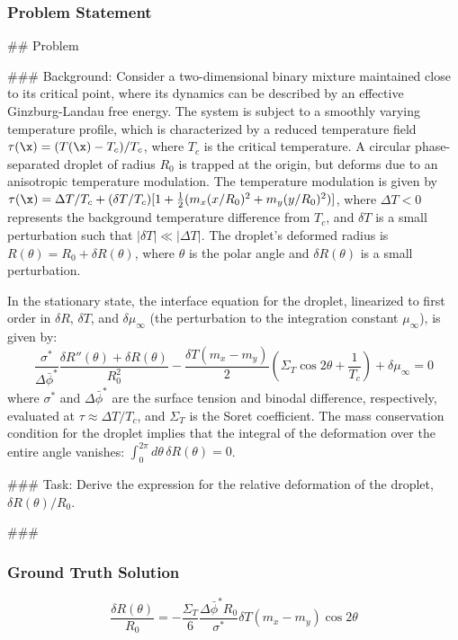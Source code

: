 \documentclass[10pt]{article}
\begin{document}
\subsubsection*{Problem Statement}
## Problem

### Background:
Consider a two-dimensional binary mixture maintained close to its critical point, where its dynamics can be described by an effective Ginzburg-Landau free energy. The system is subject to a smoothly varying temperature profile, which is characterized by a reduced temperature field $\tau(\x) = (T(\x)-T_c)/T_c$, where $T_c$ is the critical temperature. A circular phase-separated droplet of radius $R_0$ is trapped at the origin, but deforms due to an anisotropic temperature modulation. The temperature modulation is given by $\tau(\x) = \Delta T/T_c + (\delta T/T_c) [1 + \frac{1}{2}(m_x(x/R_0)^2 + m_y(y/R_0)^2)]$, where $\Delta T < 0$ represents the background temperature difference from $T_c$, and $\delta T$ is a small perturbation such that $|\delta T| \ll |\Delta T|$. The droplet's deformed radius is $R(\theta) = R_0 + \delta R(\theta)$, where $\theta$ is the polar angle and $\delta R(\theta)$ is a small perturbation.

In the stationary state, the interface equation for the droplet, linearized to first order in $\delta R$, $\delta T$, and $\delta \mu_{\infty}$ (the perturbation to the integration constant $\mu_{\infty}$), is given by:
$$
\dfrac{\sigma^*}{\Delta\bar{\phi}^*}\frac{\delta R''(\theta)+\delta R(\theta)}{R_0^2} - \frac{\delta T (m_x-m_y)}{2}\left(\Sigma_T\cos2\theta+\frac{1}{T_c}\right) + \delta\mu_{\infty}=0
$$
where $\sigma^*$ and $\Delta\bar{\phi}^*$ are the surface tension and binodal difference, respectively, evaluated at $\tau \approx \Delta T/T_c$, and $\Sigma_T$ is the Soret coefficient. The mass conservation condition for the droplet implies that the integral of the deformation over the entire angle vanishes: $\int_0^{2\pi}d\theta\,\delta R(\theta)=0$.

### Task:
Derive the expression for the relative deformation of the droplet, $\delta R(\theta)/R_0$.

###

\subsubsection*{Ground Truth Solution}
\[ \boxed{\frac{\delta R(\theta)}{R_0}= -\frac{\Sigma_T}{6}\frac{\Delta\bar{\phi}^* R_0}{\sigma^*}\delta T(m_x-m_y)\cos2\theta} \]
\end{document}
